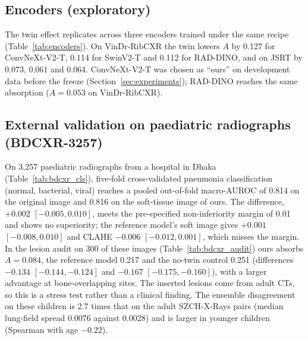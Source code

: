 \subsection{Encoders (exploratory)}
The twin effect replicates across three encoders trained under the same recipe (Table~\ref{tab:encoders}). On VinDr-RibCXR the twin lowers
$A$ by 0.127 for ConvNeXt-V2-T, 0.114 for SwinV2-T and 0.112 for RAD-DINO, and on JSRT by 0.073, 0.061 and 0.064. ConvNeXt-V2-T was chosen
as ``ours'' on development data before the freeze (Section~\ref{sec:experiments}); RAD-DINO reaches the same absorption ($A=0.053$ on
VinDr-RibCXR).
\begin{table}[htbp]
\centering\small
\caption{Twin regulariser per encoder (exploratory): absorption difference to the matched no-twin control and its interaction with bone
overlap; three seeds per model (seeds 0--2), SZCH on its 51 held-out images.}
\label{tab:encoders}
\end{table}

\subsection{External validation on paediatric radiographs (BDCXR-3257)}
\label{sec:bdcxr}
On 3,257 paediatric radiographs from a hospital in Dhaka (Table~\ref{tab:bdcxr_cls}), five-fold cross-validated pneumonia classification
(normal, bacterial, viral) reaches a pooled out-of-fold macro-AUROC of 0.814 on the original image and 0.816 on the soft-tissue image of
ours. The difference, $+0.002$ $[-0.005,0.010]$, meets the pre-specified non-inferiority margin of 0.01 and shows no superiority; the
reference model's soft image gives $+0.001$ $[-0.008,0.010]$ and CLAHE $-0.006$ $[-0.012,0.001]$, which misses the margin. In the lesion audit
on 300 of these images (Table~\ref{tab:bdcxr_audit}) ours absorbs $A=0.084$, the reference model 0.217 and the no-twin control 0.251
(differences $-0.134$ $[-0.144,-0.124]$ and $-0.167$ $[-0.175,-0.160]$), with a larger advantage at bone-overlapping sites. The inserted
lesions come from adult CTs, so this is a stress test rather than a clinical finding. The ensemble disagreement on these children is 2.7 times
that on the adult SZCH-X-Rays pairs (median lung-field spread 0.0076 against 0.0028) and is larger in younger children (Spearman with age
$-0.22$).
\begin{table}[htbp]
\centering\small
\caption{BDCXR-3257: pneumonia classification (normal, bacterial, viral), five folds over near-duplicate groups $\times$ three seeds;
pooled out-of-fold macro-AUROC, per-fold mean $\pm$ SD and the difference to the original image (group bootstrap).}
\label{tab:bdcxr_cls}
\end{table}
\begin{table}[htbp]
\centering\small
\caption{BDCXR-3257: lesion audit on a fixed class-stratified subset of 300 images (1,800 sites).}
\label{tab:bdcxr_audit}
\end{table}

